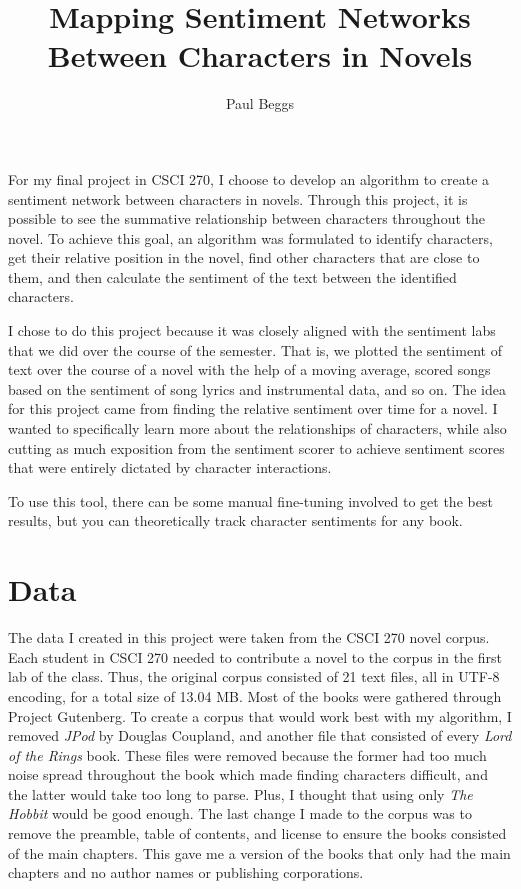 \documentclass[stu,12pt,floatsintext]{apa7}
\title{Mapping Sentiment Networks Between Characters in Novels}
\author{Paul Beggs}
\begin{document}
\maketitle

For my final project in CSCI 270, I choose to develop an algorithm to create a sentiment network between characters in novels. Through this project, it is possible to see the summative relationship between characters throughout the novel. To achieve this goal, an algorithm was formulated to identify characters, get their relative position in the novel, find other characters that are close to them, and then calculate the sentiment of the text between the identified characters. 

I chose to do this project because it was closely aligned with the sentiment labs that we did over the course of the semester. That is, we plotted the sentiment of text over the course of a novel with the help of a moving average, scored songs based on the sentiment of song lyrics and instrumental data, and so on. The idea for this project came from finding the relative sentiment over time for a novel. I wanted to specifically learn more about the relationships of characters, while also cutting as much exposition from the sentiment scorer to achieve sentiment scores that were entirely dictated by character interactions.

To use this tool, there can be some manual fine-tuning involved to get the best results, but you can theoretically track character sentiments for any book.    

\section{Data}

The data I created in this project were taken from the CSCI 270 novel corpus. Each student in CSCI 270 needed to contribute a novel to the corpus in the first lab of the class. Thus, the original corpus consisted of 21 text files, all in UTF-8 encoding, for a total size of 13.04 MB. Most of the books were gathered through Project Gutenberg. To create a corpus that would work best with my algorithm, I removed \textit{JPod} by Douglas Coupland, and another file that consisted of every \textit{Lord of the Rings} book. These files were removed because the former had too much noise spread throughout the book which made finding characters difficult, and the latter would take too long to parse. Plus, I thought that using only \textit{The Hobbit} would be good enough. The last change I made to the corpus was to remove the preamble, table of contents, and license to ensure the books consisted of the main chapters. This gave me a version of the books that only had the main chapters and no author names or publishing corporations. 
\end{document}
